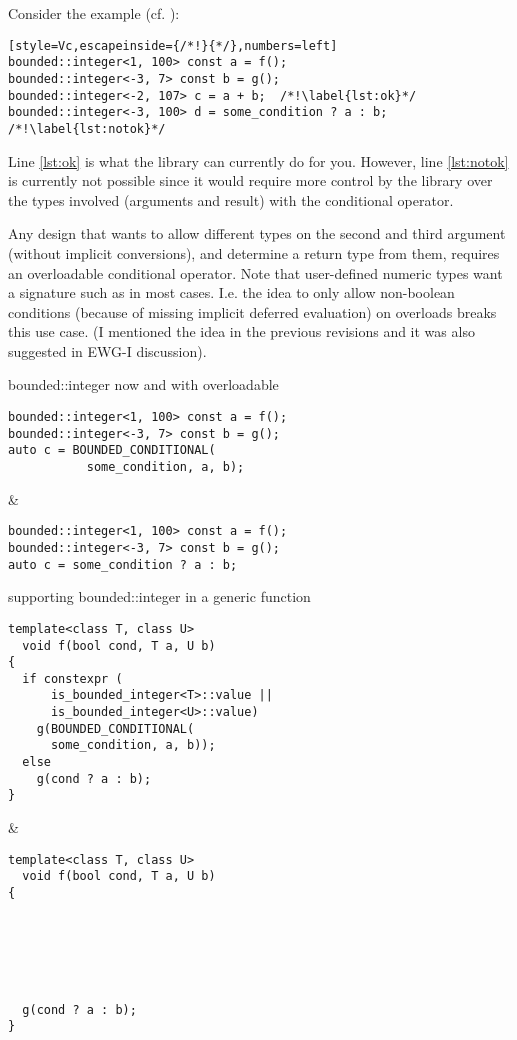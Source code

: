 Consider the  example (cf. \cite{site.bounded-integer}):
\smallskip\begin{lstlisting}[style=Vc,escapeinside={/*!}{*/},numbers=left]
bounded::integer<1, 100> const a = f();
bounded::integer<-3, 7> const b = g();
bounded::integer<-2, 107> c = a + b;  /*!\label{lst:ok}*/
bounded::integer<-3, 100> d = some_condition ? a : b;  /*!\label{lst:notok}*/
\end{lstlisting}

Line \ref{lst:ok} is what the  library can currently do for you.
However, line \ref{lst:notok} is currently not possible since it would require more control by the library over the types involved (arguments and result) with the conditional operator.

Any design that wants to allow different types on the second and third argument (without implicit conversions), and determine a return type from them, requires an overloadable conditional operator.
Note that user-defined numeric types want a signature such as  in most cases.
I.e. the idea to only allow non-boolean conditions (because of missing implicit deferred evaluation) on  overloads breaks this use case.
(I mentioned the idea in the previous revisions and it was also suggested in EWG-I discussion).

\begin{tonytable}
{bounded::integer now and with overloadable }
\begin{lstlisting}[style=Vc]
bounded::integer<1, 100> const a = f();
bounded::integer<-3, 7> const b = g();
auto c = BOUNDED_CONDITIONAL(
           some_condition, a, b);
\end{lstlisting}
&
\begin{lstlisting}[style=Vc]
bounded::integer<1, 100> const a = f();
bounded::integer<-3, 7> const b = g();
auto c = some_condition ? a : b;
\end{lstlisting}
\end{tonytable}

\begin{tonytable}
{supporting bounded::integer in a generic function}
\begin{lstlisting}[style=Vc]
template<class T, class U>
  void f(bool cond, T a, U b)
{
  if constexpr (
      is_bounded_integer<T>::value ||
      is_bounded_integer<U>::value)
    g(BOUNDED_CONDITIONAL(
      some_condition, a, b));
  else
    g(cond ? a : b);
}
\end{lstlisting}
&
\begin{lstlisting}[style=Vc]
template<class T, class U>
  void f(bool cond, T a, U b)
{






  g(cond ? a : b);
}
\end{lstlisting}
\end{tonytable}

